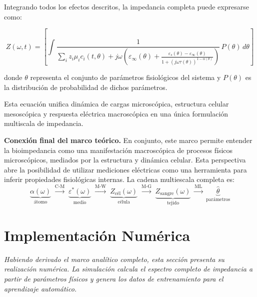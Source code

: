 \documentclass[12pt]{article}
\begin{document}
Integrando todos los efectos descritos, la impedancia completa puede expresarse como:

\begin{equation}
Z(\omega,t) =
\left[
\int
\frac{1}{
\displaystyle
\sum_i z_i \mu_i c_i(t,\theta)
+
j\omega
\left(
\varepsilon_\infty(\theta) +
\frac{\varepsilon_s(\theta) - \varepsilon_\infty(\theta)}
{1 + (j\omega\tau(\theta))^{1-\alpha(\theta)}}
\right)
}
\,P(\theta)\,d\theta
\right]
\end{equation}

donde $\theta$ representa el conjunto de par\'ametros fisiol\'ogicos del sistema y $P(\theta)$
es la distribuci\'on de probabilidad de dichos par\'ametros.

Esta ecuaci\'on unifica din\'amica de cargas microsc\'opica, estructura celular mesosc\'opica
y respuesta el\'ectrica macrosc\'opica en una \'unica formulaci\'on multiscala de impedancia.


\noindent\textbf{Conexi\'on final del marco te\'orico.}
En conjunto, este marco permite entender la bioimpedancia como una manifestaci\'on
macrosc\'opica de procesos f\'isicos microsc\'opicos, mediados por la estructura y
din\'amica celular. Esta perspectiva abre la posibilidad de utilizar mediciones
el\'ectricas como una herramienta para inferir propiedades fisiol\'ogicas internas.
La cadena multiescala completa es:
\begin{equation}
\underbrace{\alpha(\omega)}_{\text{\'atomo}}
\;\xrightarrow{\text{C-M}}\;
\underbrace{\varepsilon^*(\omega)}_{\text{medio}}
\;\xrightarrow{\text{M-W}}\;
\underbrace{Z_{\text{c\'el}}(\omega)}_{\text{c\'elula}}
\;\xrightarrow{\text{M-G}}\;
\underbrace{Z_{\text{sangre}}(\omega)}_{\text{tejido}}
\;\xrightarrow{\text{ML}}\;
\underbrace{\hat{\theta}}_{\text{par\'ametros}}
\end{equation}


\section{Implementaci\'on Num\'erica}
\label{sec:numerical}


\noindent\textit{Habiendo derivado el marco anal\'itico completo, esta secci\'on presenta su
realizaci\'on num\'erica. La simulaci\'on calcula el espectro completo de impedancia a partir de
par\'ametros f\'isicos y genera los datos de entrenamiento para el aprendizaje autom\'atico.}
\end{document}
